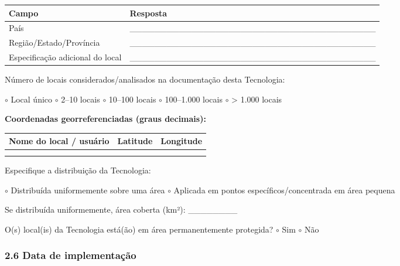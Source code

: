 {
\begin{longtable}[]{@{}
  >{\raggedright\arraybackslash}p{}
  >{\raggedright\arraybackslash}p{}@{}}
\toprule\noalign{}
\begin{minipage}[b]{\linewidth}\raggedright
Campo
\end{minipage} & \begin{minipage}[b]{\linewidth}\raggedright
Resposta
\end{minipage} \\
\midrule\noalign{}
\endhead
\bottomrule\noalign{}
\endlastfoot
País & \_\_\_\_\_\_\_\_\_\_\_\_\_\_\_\_\_\_\_\_\_\_\_\_\_\_\_\_\_\_\_\_\_\_\_\_\_\_\_\_ \\
Região/Estado/Província & \_\_\_\_\_\_\_\_\_\_\_\_\_\_\_\_\_\_\_\_\_\_\_\_\_\_\_\_\_\_\_\_\_\_\_\_\_\_\_\_ \\
Especificação adicional do local & \_\_\_\_\_\_\_\_\_\_\_\_\_\_\_\_\_\_\_\_\_\_\_\_\_\_\_\_\_\_\_\_\_\_\_\_\_\_\_\_ \\
\end{longtable}
}

Número de locais considerados/analisados na documentação desta Tecnologia:

$\circ$ Local único $\circ$ 2--10 locais $\circ$ 10--100 locais $\circ$ 100--1.000 locais $\circ$ \textgreater{} 1.000 locais

\textbf{Coordenadas georreferenciadas (graus decimais):}

{
\begin{longtable}[]{@{}lll@{}}
\toprule\noalign{}
Nome do local / usuário & Latitude & Longitude \\
\midrule\noalign{}
\endhead
\bottomrule\noalign{}
\endlastfoot
& & \\
& & \\
\end{longtable}
}

Especifique a distribuição da Tecnologia:

$\circ$ Distribuída uniformemente sobre uma área $\circ$ Aplicada em pontos específicos/concentrada em área pequena

Se distribuída uniformemente, área coberta (km²): \_\_\_\_\_\_\_\_

O(s) local(is) da Tecnologia está(ão) em área permanentemente protegida? $\circ$ Sim $\circ$ Não

\subsubsection{2.6 Data de implementação}\label{data-de-implementauxe7uxe3o}

